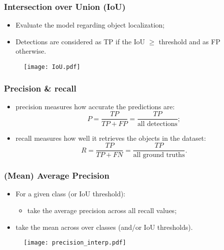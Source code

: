 \documentclass{beamer}
\begin{document}
			\begin{frame}\frametitle{Intersection over Union (IoU)}
				\begin{itemize}
					\item Evaluate the model regarding object localization;
					\item Detections are considered as TP if the IoU $\geq$ threshold and as FP otherwise.
				\end{itemize}
				\begin{figure}[htb]
					\centering
					\texttt{[image: IoU.pdf]}
					\label{fig:IoU}
				\end{figure}

			\end{frame}


			\begin{frame}\frametitle{Precision \& recall}
				\begin{itemize}
					\item precision measures how accurate the predictions are:
					\begin{equation*}
						P = \frac{TP}{TP + FP} = \frac{TP}{\textrm{all detections}};
						\label{eq:precision}
						\end{equation*}
					\item recall measures how well it retrieves the objects in the dataset:
					\begin{equation*}
						R = \frac{TP}{TP + FN} = \frac{TP}{\textrm{all ground truths}}.
						\label{eq:recall}
						\end{equation*}
				\end{itemize}
			\end{frame}


			\begin{frame}\frametitle{(Mean) Average Precision}
				\begin{itemize}
					\item For a given class (or IoU threshold):
				\begin{itemize}
					\item take the average precision across all recall values;
				\end{itemize}
				\item take the mean across over classes (and/or IoU thresholds).
				\end{itemize}
				\begin{figure}[bh!]
					\centering
					\texttt{[image: precision\_interp.pdf]}
					\label{fig:prec-rec_curve_interp}
				\end{figure}
			\end{frame}
\end{document}
